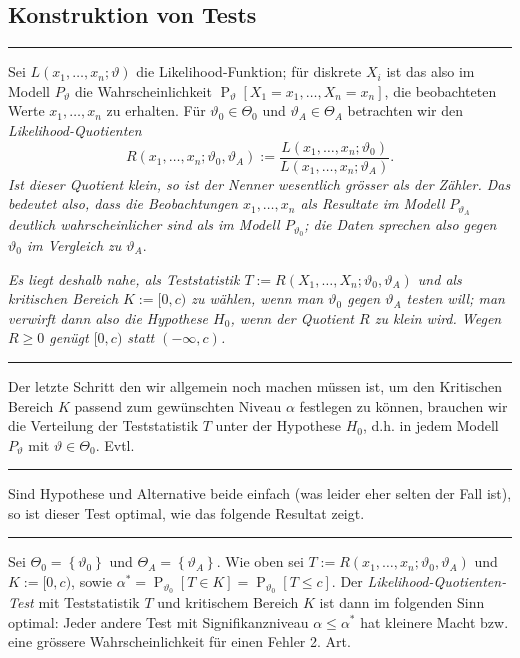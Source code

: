 \documentclass[a4paper, 12pt]{extarticle}
\newcommand{\sep}{\vspace{5pt}\noindent\hrule\vspace{5pt}}
\newcommand{\set}[1]{\left\{ #1 \right\}}
\newcommand{\Prob}[2][]{\operatorname{P}_{#1}\left[ #2 \right]}
\begin{document}
\begin{multicols*}{2}
\subsection{Konstruktion von Tests}

\sep

 Sei $L(x_1,\ldots,x_n;\vartheta)$ die
Likelihood-Funktion; für diskrete $X_i$ ist das also im Modell $P_\vartheta$ die
Wahrscheinlichkeit $\Prob[\vartheta]{X_1=x_1,\ldots,X_n=x_n}$, die beobachteten
Werte $x_1,\ldots,x_n$ zu erhalten. Für $\vartheta_0\in\Theta_0$ und
$\vartheta_A\in\Theta_A$ betrachten wir den \emph{Likelihood-Quotienten} 
\[
R(x_1,\ldots,x_n;\vartheta_0,\vartheta_A):=
\frac{L(x_1,\ldots,x_n;\vartheta_0)}{L(x_1,\ldots,x_n;\vartheta_A)}.
\]
\emph{Ist dieser Quotient klein, so ist der Nenner wesentlich grösser als der
Zähler.
Das bedeutet also, dass die Beobachtungen $x_1,\ldots,x_n$ als Resultate im
Modell $P_{\vartheta_A}$ deutlich wahrscheinlicher sind als im Modell
$P_{\vartheta_0}$; die Daten sprechen also gegen $\vartheta_0$ im Vergleich zu
$\vartheta_A$}.

\emph{Es liegt deshalb nahe, als Teststatistik
$T:=R(X_1,\ldots,X_n;\vartheta_0,\vartheta_A)$ und als kritischen Bereich
$K:=[0,c)$ zu wählen, wenn man $\vartheta_0$ gegen $\vartheta_A$ testen will;
man verwirft dann also die Hypothese $H_0$, wenn der Quotient $R$ zu klein wird.
Wegen $R\geq 0$ genügt $[0,c)$ statt $(-\infty,c)$.}

\sep

Der letzte Schritt den wir allgemein noch machen müssen ist, um den Kritischen
Bereich $K$ passend zum gewünschten Niveau $\alpha$ festlegen zu können,
brauchen wir die Verteilung der Teststatistik $T$ unter der Hypothese $H_0$,
d.h. in jedem Modell $P_\vartheta$ mit $\vartheta\in\Theta_0$. Evtl. 

\sep

Sind Hypothese und Alternative beide einfach (was leider eher selten der Fall
ist), so ist dieser Test optimal, wie das folgende Resultat zeigt.

\sep

 Sei $\Theta_0=\set{\vartheta_0}$ und
$\Theta_A=\set{\vartheta_A}$. Wie oben sei
$T:=R(x_1,\ldots,x_n;\vartheta_0,\vartheta_A)$ und $K:=[0,c)$, sowie
$\alpha^*=\Prob[\vartheta_0]{T\in K}=\Prob[\vartheta_0]{T\leq c}$. Der
\emph{Likelihood-Quotienten-Test} mit Teststatistik $T$ und kritischem Bereich
$K$ ist dann im folgenden Sinn optimal: Jeder andere Test mit Signifikanzniveau
$\alpha\leq\alpha^*$ hat kleinere Macht bzw. eine grössere Wahrscheinlichkeit
für einen Fehler 2. Art. 


\end{multicols*}
\end{document}
